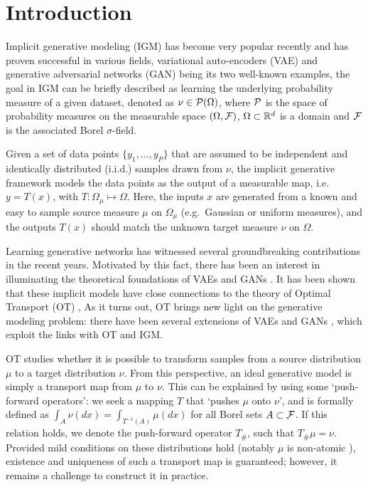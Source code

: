 
\section{Introduction}


Implicit generative modeling (IGM) \cite{diggle1984monte, mohamed2016learning} has become very popular recently and has proven
successful in various fields, variational auto-encoders (VAE) \cite{kingma2013VAE} and generative adversarial networks (GAN) \cite{goodfellow2014generative} being its two well-known examples, the goal in IGM can be briefly described as learning the
underlying probability measure of a given dataset, denoted as $\nu \in {\cal P}(\Omega)$, where ${\cal P}$ is the space of probability measures on the measurable space $(\Omega,\mathcal{F})$, $\Omega \subset \mathbb{R}^d$ is a domain and $\mathcal{F}$ is the associated Borel $\sigma$-field. 

Given a set of data points $\{y_1 , \dots , y_P \}$ that are assumed to be independent and identically distributed (i.i.d.) samples drawn from $\nu$, the implicit generative framework models the data points as the output of a measurable map, i.e.\ $y = T(x)$, with $T: \Omega_\mu \mapsto \Omega$. Here, the inputs $x$ are generated from a known and easy to sample source measure $\mu$ on $\Omega_\mu$ (e.g.\ Gaussian or uniform measures), and the outputs $T(x)$ should match the unknown target measure $\nu$ on $\Omega$. 




Learning generative networks has witnessed several groundbreaking contributions in the recent years. Motivated by this fact, there has been an interest in illuminating the theoretical foundations of VAEs and GANs \cite{bousquet2017optimal,liu2017approximation}. 
%
It has been shown that these implicit models have close connections to the theory of Optimal Transport (OT) \cite{villani2008optimal}, 
%
As it turns out, OT brings new light on the generative modeling problem: there have been several extensions of VAEs \cite{tolstikhin2017wasserstein,kolouri2018sliced} and GANs \cite{arjovsky2017wasserstein,gulrajani2017improved,guo2017relaxed,lei2017geometric}, which exploit the links with OT and IGM. 


OT studies whether it is possible to transform samples from a source distribution $\mu$ to a target distribution $\nu$. From this perspective, an ideal generative model is simply a transport map from $\mu$ to $\nu$.  
This can be explained by using some `push-forward operators': we seek a mapping $T$ that `pushes $\mu$ onto $\nu$', and is formally defined as $\int_A \nu(dx) = \int_{T^{-1}(A)} \mu(dx) $ for all Borel sets $A \subset \mathcal{F}$. If this relation holds, we denote the push-forward operator $T_\#$, such that $T_\# \mu = \nu$. Provided mild conditions on these distributions hold (notably $\mu$ is non-atomic \cite{villani2008optimal}), existence and uniqueness of such a transport map is guaranteed; however, it remains a challenge to construct it in practice.

